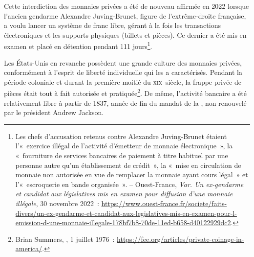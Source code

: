 Cette interdiction des monnaies privées a été de nouveau affirmée en 2022 lorsque l'ancien gendarme Alexandre Juving-Brunet, figure de l'extrême-droite française, a voulu lancer un système de franc libre, gérant à la fois les transactions électroniques et les supports physiques (billets et pièces). Ce dernier a été mis en examen et placé en détention pendant 111 jours\footnote{Les chefs d'accusation retenus contre Alexandre Juving-Brunet étaient l'«~exercice illégal de l'activité d'émetteur de monnaie électronique~», la «~fourniture de services bancaires de paiement à titre habituel par une personne autre qu'un établissement de crédit~», la «~mise en circulation de monnaie non autorisée en vue de remplacer la monnaie ayant cours légal~» et l'«~escroquerie en bande organisée~». -- Ouest-France, \emph{Var. Un ex-gendarme et candidat aux législatives mis en examen pour diffusion d'une monnaie illégale}, 30 novembre 2022~: \url{https://www.ouest-france.fr/societe/faits-divers/un-ex-gendarme-et-candidat-aux-legislatives-mis-en-examen-pour-l-emission-d-une-monnaie-illegale-178bf7b8-70de-11ed-b658-d40122929dc2}.}.

Les États-Unis en revanche possèdent une grande culture des monnaies privées, conformément à l'esprit de liberté individuelle qui les a caractérisés. Pendant la période coloniale et durant la première moitié du \textsc{xix}\ieme{}~siècle, la frappe privée de pièces était tout à fait autorisée et pratiquée\footnote{Brian Summers, , 1\ier{} juillet 1976~: \url{https://fee.org/articles/private-coinage-in-america/}.}. De même, l'activité bancaire a été relativement libre à partir de 1837, année de fin du mandat de la , non renouvelé par le président Andrew Jackson.

